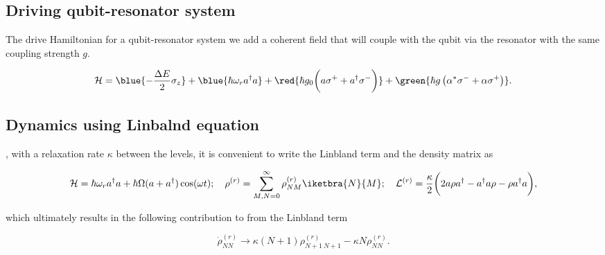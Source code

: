 \subsection{Driving qubit-resonator system}
\label{sec:driving-system}

The drive Hamiltonian  for a qubit-resonator system we add  a coherent field that
will couple with the qubit via the resonator with the same coupling strength $g$.

\begin{equation}
  \mathcal{H}     =\blue{-\frac{\Delta
      E}{2}\sigma_z}+\blue{{\hbar\omega_r}a^\dagger
    a}             +             \red{\hbar
    g_0\bigg({a\sigma^+}+{a^{\dagger}\sigma^-}\bigg)} + \green{\hbar g \left( \alpha^{*}\sigma^{-}+\alpha\sigma^{+} \right)}.
\end{equation}

\subsection{Dynamics using Linbalnd equation}
\label{sec:dynam-using-linb}

\noindent {}, with a
relaxation rate  $ \kappa  $ between the  levels, it is  convenient to  write the
Linbland term and the density matrix as

\begin{equation}\label{ar2}
  \mathcal{H} = \hbar\omega_ra^{\dagger}a+\hbar\Omega(a+a^{\dagger})\cos(\omega t);\quad\rho^{(r)} = \sum_{M,N=0}^{\infty}\rho_{NM}^{(r)}\iketbra{N}{M};\quad \mathcal{L}^{(r)} = \frac{\kappa}{2}\bigg(2a\rho a^{\dagger}-a^{\dagger}a\rho-\rho a^{\dagger}a\bigg),
\end{equation}

\noindent  which ultimately  results in  the following  contribution to  from the
Linbland term

\begin{equation}\label{ar3}
  \dot{\rho}_{NN}^{(r)} \rightarrow \kappa(N+1)\rho_{N+1\ N+1}^{(r)} - \kappa N \rho_{NN}^{(r)}.
\end{equation}


